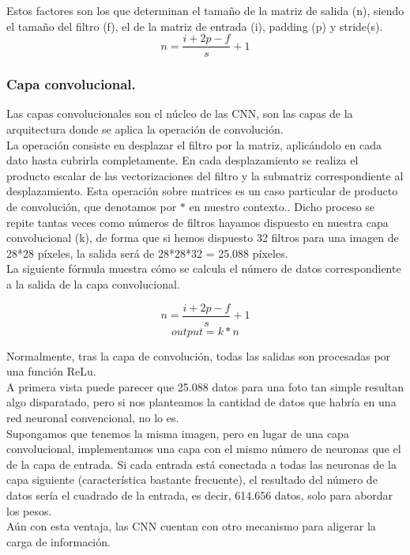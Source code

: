 \documentclass[a4paper,11pt]{article}
\begin{document}
Estos factores son los que determinan el tamaño de la matriz de salida (n), siendo el tamaño del filtro (f), el de la matriz de entrada (i), padding (p) y stride(s).
\[
n=\frac{i+2p-f}{s}  +1
\]


\subsubsection{Capa convolucional.}
Las capas convolucionales son el núcleo de las CNN, son las capas de la arquitectura donde se aplica la operación de convolución. \\

\noindent
La operación consiste en desplazar el filtro por la matriz, aplicándolo en cada dato hasta cubrirla completamente. En cada desplazamiento se realiza el producto escalar de las vectorizaciones del filtro y la submatriz correspondiente al desplazamiento. Esta operación sobre matrices es un caso particular de producto de convolución, que denotamos por $*$ en nuestro contexto.. Dicho proceso se repite tantas veces como números de filtros hayamos dispuesto en nuestra capa convolucional (k), de forma que si hemos dispuesto 32 filtros para una imagen de 28*28 píxeles, la salida será de 28*28*32 = 25.088 píxeles.\\

\noindent
La siguiente fórmula muestra cómo se calcula el número de datos correspondiente a la salida de la capa convolucional.

\[
n=\frac{i+2p-f}{s}  +1
\]
\[
output = k * n
\]

Normalmente, tras la capa de convolución, todas las salidas son procesadas por una función ReLu.\\

\noindent
A primera vista puede parecer que 25.088 datos para una foto tan simple resultan algo disparatado, pero si nos planteamos la cantidad de datos que habría en una red neuronal convencional, no lo es. \\

\noindent
Supongamos que tenemos la misma imagen, pero en lugar de una capa convolucional, implementamos una capa con el mismo número de neuronas que el de la capa de entrada. Si cada entrada está conectada a todas las neuronas de la capa siguiente (característica bastante frecuente), el resultado del número de datos sería el cuadrado de la entrada, es decir, 614.656 datos, solo para abordar los pesos. \\

\noindent
Aún con esta ventaja, las CNN cuentan con otro mecanismo para aligerar la carga de información.
\end{document}
